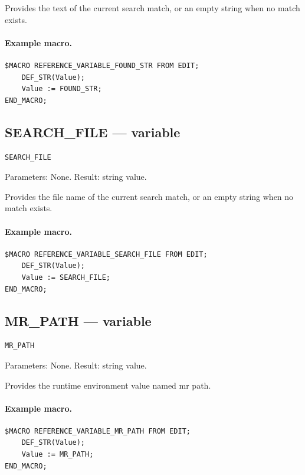 \documentclass[a4paper,10pt,twoside,openany]{book}
\begin{document}
Provides the text of the current search match, or an empty string when no match exists.

\paragraph{Example macro.}
\begin{verbatim}
$MACRO REFERENCE_VARIABLE_FOUND_STR FROM EDIT;
    DEF_STR(Value);
    Value := FOUND_STR;
END_MACRO;
\end{verbatim}

\label{prim:variable-search-file}
\subsection*{SEARCH\_FILE --- variable}
\begin{verbatim}
SEARCH_FILE
\end{verbatim}
Parameters: None. Result: string value.

Provides the file name of the current search match, or an empty string when no match exists.

\paragraph{Example macro.}
\begin{verbatim}
$MACRO REFERENCE_VARIABLE_SEARCH_FILE FROM EDIT;
    DEF_STR(Value);
    Value := SEARCH_FILE;
END_MACRO;
\end{verbatim}

\label{prim:variable-mr-path}
\subsection*{MR\_PATH --- variable}
\begin{verbatim}
MR_PATH
\end{verbatim}
Parameters: None. Result: string value.

Provides the runtime environment value named mr path.

\paragraph{Example macro.}
\begin{verbatim}
$MACRO REFERENCE_VARIABLE_MR_PATH FROM EDIT;
    DEF_STR(Value);
    Value := MR_PATH;
END_MACRO;
\end{verbatim}
\end{document}
